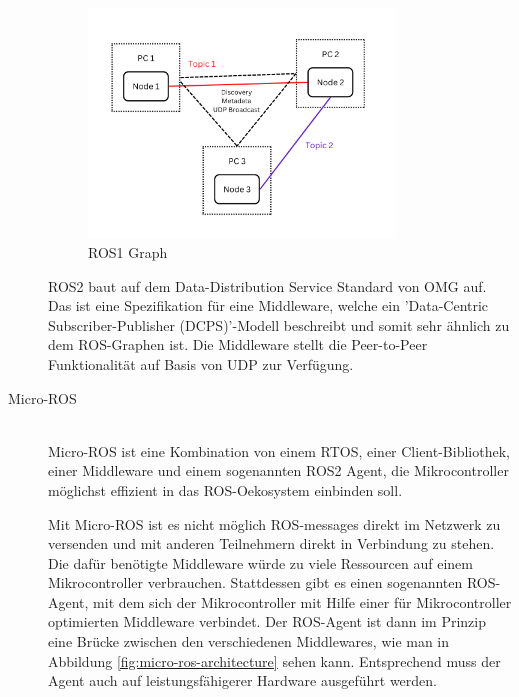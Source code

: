 \begin{flushleft}
\begin{description}
        \begin{figure}[h!]
            \centering
            \includegraphics[width=0.8\textwidth]{imgs/ROS2_concept_graph.png}
            \caption{ROS1 Graph}
            \label{fig:ros2_concept_graph}%
        \end{figure}

        ROS2 baut auf dem Data-Distribution Service Standard von OMG auf. 
        Das ist eine Spezifikation für eine Middleware, welche ein 'Data-Centric Subscriber-Publisher (DCPS)'-Modell beschreibt und somit sehr ähnlich zu dem ROS-Graphen ist. 
        Die Middleware stellt die Peer-to-Peer Funktionalität auf Basis von UDP zur Verfügung.

        \item[Micro-ROS]\hfill\\
        Micro-ROS ist eine Kombination von einem RTOS, einer Client-Bibliothek, einer Middleware und einem sogenannten ROS2 Agent, 
        die Mikrocontroller möglichst effizient in das ROS-Oekosystem einbinden soll.
        
        Mit Micro-ROS ist es nicht möglich ROS-messages direkt im Netzwerk zu versenden und mit anderen Teilnehmern direkt in Verbindung zu stehen.
        Die dafür benötigte Middleware würde zu viele Ressourcen auf einem Mikrocontroller verbrauchen. 
        Stattdessen gibt es einen sogenannten ROS-Agent, mit dem sich der Mikrocontroller mit Hilfe einer für Mikrocontroller optimierten Middleware verbindet.
        Der ROS-Agent ist dann im Prinzip eine Brücke zwischen den verschiedenen Middlewares, wie man in Abbildung \ref{fig:micro-ros-architecture} sehen kann. Entsprechend muss der Agent auch auf leistungsfähigerer Hardware ausgeführt werden.    
        \cite{micro_ros_concepts}


\end{description}
\end{flushleft}
